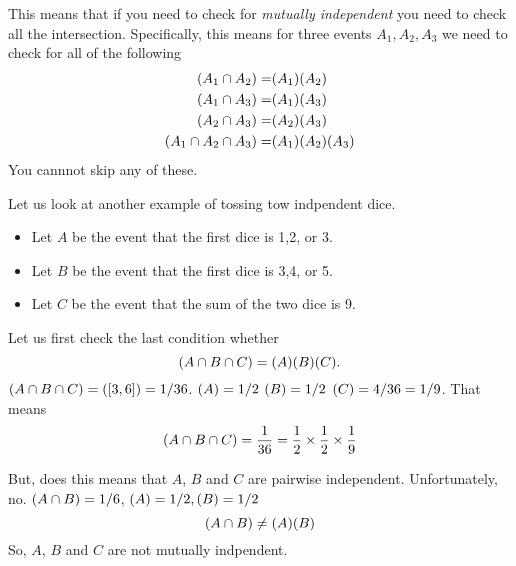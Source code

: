 \documentclass[a4paper, 12pt]{article}
\let\Pr\relax
\DeclareMathOperator{\Pr}{Pr}
\begin{document}
\begin{multicols}{2}
This means that if you need to check for \emph{mutually independent} you need to check all the intersection. Specifically, this means for three events $A_1, A_2, A_3$ we need to check for all of the following
\begin{align*}
	\Pr(A_1 \cap A_2) =& \Pr(A_1) \Pr(A_2)\\
	\Pr(A_1 \cap A_3) =& \Pr(A_1) \Pr(A_3)\\
	\Pr(A_2 \cap A_3) =& \Pr(A_2) \Pr(A_3)\\
	\Pr(A_1 \cap A_2 \cap A_3) =& \Pr(A_1) \Pr(A_2) \Pr(A_3)
\end{align*}
You cannnot skip any of these.

Let us look at another example of tossing tow indpendent dice.
\begin{itemize}
	\item Let $A$ be the event that the first dice is 1,2, or 3.
	\item Let $B$ be the event that the first dice is 3,4, or 5.
	\item Let $C$ be the event that the sum of the two dice is 9.
\end{itemize}

Let us first check the last condition whether
\[
	\Pr(A \cap B \cap C) = \Pr(A) \Pr(B) \Pr(C).
\]
$\Pr(A \cap B \cap C) = \Pr([3,6])=1/36$. $\Pr(A)=1/2$ $\Pr(B)=1/2$ $\Pr(C)=4/36=1/9$. That means
\[
\Pr(A \cap B \cap C) =\frac{1}{36} =\frac{1}{2} \times \frac{1}{2} \times \frac{1}{9}
\]

But, does this means that $A$, $B$ and $C$ are pairwise independent. Unfortunately, no. $\Pr(A\cap B) = 1/6$, $\Pr(A) = 1/2, \Pr(B)=1/2$
\[
	\Pr(A\cap B) \ne \Pr(A) \Pr(B)
\]
So, $A$, $B$ and $C$ are not mutually indpendent.

\end{multicols}
\end{document}
